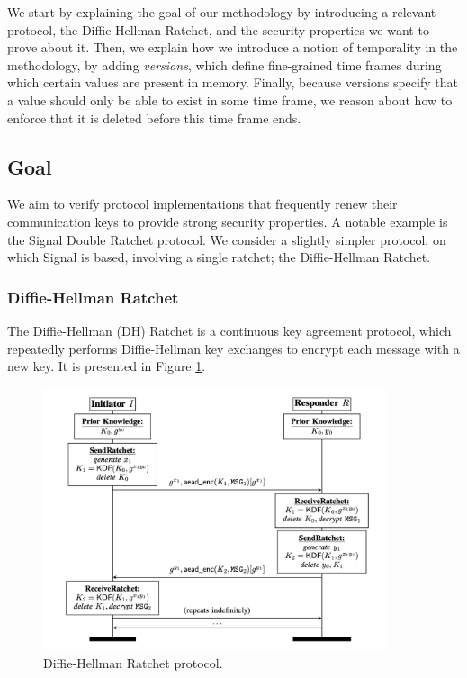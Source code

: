 We start by explaining the goal of our methodology by introducing a relevant protocol, the Diffie-Hellman Ratchet, and the security properties we want to prove about it.
Then, we explain how we introduce a notion of temporality in the methodology, by adding  \emph{versions}, which define fine-grained time frames during which certain values are present in memory.
Finally, because versions specify that a value should only be able to exist in some time frame, we reason about how to enforce that it is deleted before this time frame ends.

\subsection{Goal}
\label{sec:goal}

We aim to verify protocol implementations that frequently renew their communication keys to provide strong security properties.
A notable example is the Signal Double Ratchet protocol.
We consider a slightly simpler protocol, on which Signal is based, involving a single ratchet; the Diffie-Hellman Ratchet.

\subsubsection{Diffie-Hellman Ratchet}
\label{sec:diffie-hellman-ratchet}

The Diffie-Hellman (DH) Ratchet is a continuous key agreement protocol, which repeatedly performs Diffie-Hellman key exchanges to encrypt each message with a new key.
It is presented in Figure \ref{fig:dh-ratchet}.

\begin{figure}
    \centering
    \includegraphics[width=0.9\textwidth]{figures/DH-ratchet.png}
    \caption{Diffie-Hellman Ratchet protocol.}
    \label{fig:dh-ratchet}
\end{figure}

